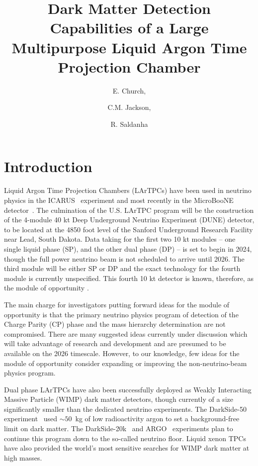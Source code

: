 \documentclass[a4paper,11pt]{article}
\title{Dark Matter Detection Capabilities of a Large Multipurpose Liquid Argon Time Projection Chamber}
\author{E. Church,} %
\author{C.M. Jackson,}
\author{R. Saldanha}
\affiliation{Pacific Northwest National Laboratory, Richland, WA 99354}
\begin{document}
\setcounter{tocdepth}{2}
\maketitle
\flushbottom

\section{Introduction}
\label{sec:intro}

Liquid Argon Time Projection Chambers (LArTPCs) have been used in neutrino physics in the ICARUS~\cite{ICARUS} experiment and most recently in the MicroBooNE detector~\cite{MicroB}. The culmination of the U.S. LArTPC program will be the construction of the 4-module 40 kt Deep Underground Neutrino Experiment (DUNE) detector, to be located at the 4850 foot level of the Sanford Underground Research Facility near Lead, South Dakota. Data taking for the first two 10 kt modules -- one single liquid phase (SP), and the other dual phase (DP) -- is set to begin in 2024, though the full power neutrino beam is not scheduled to arrive until 2026. The third module will be either SP or DP and the exact technology for the fourth module is currently unspecified. This fourth 10 kt detector is known, therefore, as the module of opportunity \cite{dune_mood}. 

The main charge for investigators putting forward ideas for the module of opportunity is that the primary neutrino physics program of detection of the Charge Parity (CP) phase and the mass hierarchy determination are not compromised.  There are many suggested ideas currently under discussion which will take advantage of research and development and are presumed to be available on the 2026 timescale. However, to our knowledge, few ideas for the module of opportunity consider expanding or improving the non-neutrino-beam physics program. 

Dual phase LArTPCs have also been successfully deployed as Weakly Interacting Massive Particle (WIMP) dark matter detectors, though currently of a size significantly smaller than the dedicated neutrino experiments. The DarkSide-50 experiment~\cite{agnes2018darkside} used $\sim 50$~kg of low radioactivity argon to set a background-free limit on dark matter. The DarkSide-20k~\cite{DarkSide-20k} and ARGO~\cite{DarkSide-20k}  experiments plan to continue this program down to the so-called neutrino floor. Liquid xenon TPCs~\cite{xenon1t} have also provided the world's most sensitive searches for WIMP dark matter at high masses.
\end{document}
